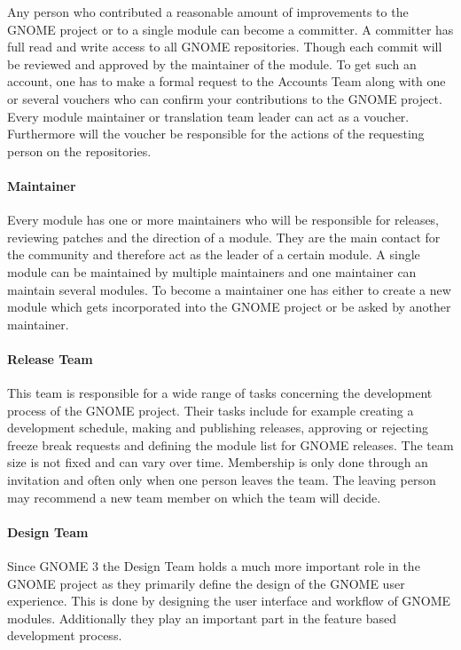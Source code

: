 Any person who contributed a reasonable amount of improvements to the GNOME
project or to a single module can become a committer. A committer has full read
and write access to all GNOME repositories. Though each commit will be reviewed
and approved by the maintainer of the module. To get such an account, one has
to make a formal request to the Accounts Team along with one or several
vouchers who can confirm your contributions to the GNOME project. Every module
maintainer or translation team leader can act as a voucher. Furthermore will
the voucher be responsible for the actions of the requesting person on the
repositories.

\paragraph{Maintainer}

Every module has one or more maintainers who will be responsible for releases,
reviewing patches and the direction of a module. They are the main contact for
the community and therefore act as the leader of a certain module. A single
module can be maintained by multiple maintainers and one maintainer can
maintain several modules. To become a maintainer one has either to create a new
module which gets incorporated into the GNOME project or be asked by another
maintainer.

\paragraph{Release Team}

This team is responsible for a wide range of tasks concerning the development
process of the GNOME project. Their tasks include for example creating a
development schedule, making and publishing releases, approving or rejecting
freeze break requests and defining the module list for GNOME releases. The team
size is not fixed and can vary over time. Membership is only done through an
invitation and often only when one person leaves the team. The leaving person
may recommend a new team member on which the team will decide.

\paragraph{Design Team}

Since GNOME 3 the Design Team holds a much more important role in the GNOME
project as they primarily define the design of the GNOME user experience. This
is done by designing the user interface and workflow of GNOME modules.
Additionally they play an important part in the feature based development
process.

